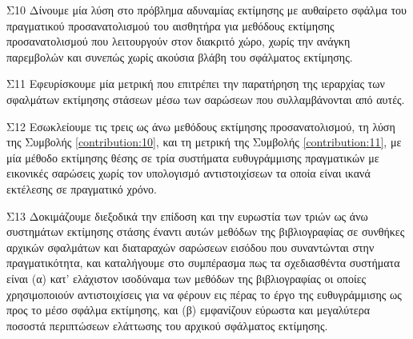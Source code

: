 \begin{bw_box}
\begin{customcontribution}{Σ10}
  \label{contribution:10}
  Δίνουμε μία λύση στο πρόβλημα αδυναμίας εκτίμησης με αυθαίρετο σφάλμα του
  πραγματικού προσανατολισμού του αισθητήρα για μεθόδους εκτίμησης
  προσανατολισμού που λειτουργούν στον διακριτό χώρο, χωρίς την ανάγκη
  παρεμβολών και συνεπώς χωρίς ακούσια βλάβη του σφάλματος εκτίμησης.
\end{customcontribution}
\end{bw_box}

\begin{bw_box}
\begin{customcontribution}{Σ11}
  \label{contribution:11}
  Εφευρίσκουμε μία μετρική που επιτρέπει την παρατήρηση της ιεραρχίας των
  σφαλμάτων εκτίμησης στάσεων μέσω των σαρώσεων που συλλαμβάνονται από αυτές.
\end{customcontribution}
\end{bw_box}

\begin{bw_box}
\begin{customcontribution}{Σ12}
  \label{contribution:12}
  Εσωκλείουμε τις τρεις ως άνω μεθόδους εκτίμησης προσανατολισμού, τη λύση της
  Συμβολής \ref{contribution:10}, και τη μετρική της Συμβολής
  \ref{contribution:11}, με μία μέθοδο εκτίμησης θέσης σε τρία συστήματα
  ευθυγράμμισης πραγματικών με εικονικές σαρώσεις χωρίς τον υπολογισμό
  αντιστοιχίσεων τα οποία είναι ικανά εκτέλεσης σε πραγματικό χρόνο.
\end{customcontribution}
\end{bw_box}

\begin{bw_box}
\begin{customcontribution}{Σ13}
  \label{contribution:13}
  Δοκιμάζουμε διεξοδικά την επίδοση και την ευρωστία των τριών ως άνω
  συστημάτων εκτίμησης στάσης έναντι αυτών μεθόδων της βιβλιογραφίας σε
  συνθήκες αρχικών σφαλμάτων και διαταραχών σαρώσεων εισόδου που συναντώνται
  στην πραγματικότητα, και καταλήγουμε στο συμπέρασμα πως τα σχεδιασθέντα
  συστήματα είναι (α) κατ' ελάχιστον ισοδύναμα των μεθόδων της βιβλιογραφίας οι
  οποίες χρησιμοποιούν αντιστοιχίσεις για να φέρουν εις πέρας το έργο της
  ευθυγράμμισης ως προς το μέσο σφάλμα εκτίμησης, και (β) εμφανίζουν εύρωστα
  και μεγαλύτερα ποσοστά περιπτώσεων ελάττωσης του αρχικού σφάλματος εκτίμησης.
\end{customcontribution}
\end{bw_box}




